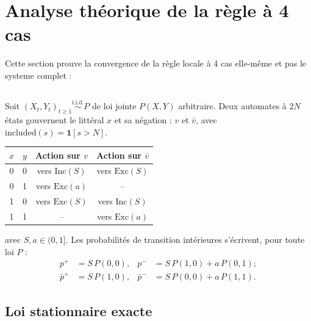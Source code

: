 \documentclass[12pt,a4paper]{article}
\newcommand{\Inc}{\ensuremath{\mathrm{Inc}}}
\newcommand{\Exc}{\ensuremath{\mathrm{Exc}}}
\newcommand{\vbar}{\bar{v}}
\begin{document}
\section*{Analyse théorique de la règle à 4 cas}

Cette section prouve la convergence de la règle locale à 4 cas elle-même et pas le systeme complet : 

\subsection*{}

Soit $(X_t,Y_t)_{t\ge1}\overset{\text{i.i.d.}}{\sim}P$ de loi jointe $P(X,Y)$
arbitraire. Deux automates à $2N$ états gouvernent le littéral $x$ et sa
négation : $v$ et $\vbar$, avec $\mathrm{included}(s)=\mathbf 1[s>N]$.

\begin{center}
\begin{tabular}{cccc}
\toprule
$x$ & $y$ & Action sur $v$ & Action sur $\vbar$ \\
\midrule
0 & 0 & vers $\Inc(S)$ & vers $\Exc(S)$ \\
0 & 1 & vers $\Exc(a)$ & -- \\
1 & 0 & vers $\Exc(S)$ & vers $\Inc(S)$ \\
1 & 1 & -- & vers $\Exc(a)$ \\
\bottomrule
\end{tabular}
\end{center}

avec $S,a\in(0,1]$. Les probabilités de transition intérieures s'écrivent, pour toute loi $P$ :
\begin{align}
  p^+ &= S\,P(0,0), & p^- &= S\,P(1,0) + a\,P(0,1); \label{eq:pv}\\
  \bar p^+ &= S\,P(1,0), & \bar p^- &= S\,P(0,0) + a\,P(1,1). \label{eq:pvbar}
\end{align}



\subsection*{Loi stationnaire exacte}
\end{document}

